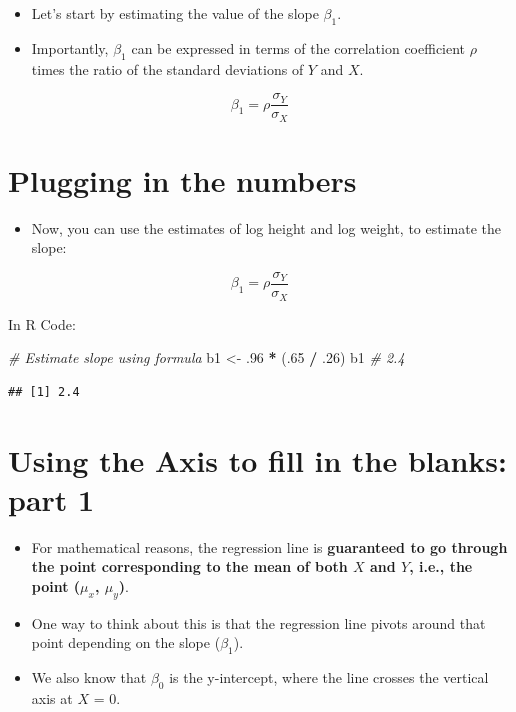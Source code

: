 \documentclass[
]{article}
\newenvironment{Shaded}{\begin{snugshade}}{\end{snugshade}}
\newcommand{\CommentTok}[1]{\textcolor[rgb]{0.56,0.35,0.01}{\textit{#1}}}
\newcommand{\DecValTok}[1]{\textcolor[rgb]{0.00,0.00,0.81}{#1}}
\newcommand{\NormalTok}[1]{#1}
\newcommand{\OtherTok}[1]{\textcolor[rgb]{0.56,0.35,0.01}{#1}}
\newcommand{\SpecialCharTok}[1]{\textcolor[rgb]{0.81,0.36,0.00}{\textbf{#1}}}
\providecommand{\tightlist}{%
  \setlength{\itemsep}{0pt}\setlength{\parskip}{0pt}}
\begin{document}
\begin{itemize}
\tightlist
\item
  Let's start by estimating the value of the slope \(\beta_1\).
\item
  Importantly, \(\beta_1\) can be expressed in terms of the correlation
  coefficient \(\rho\) times the ratio of the standard deviations of
  \(Y\) and \(X\).
\end{itemize}

\[\beta_1 = \rho\frac{ \sigma_Y}{\sigma_X}\]

\hypertarget{plugging-in-the-numbers}{%
\section{Plugging in the numbers}\label{plugging-in-the-numbers}}

\begin{itemize}
\tightlist
\item
  Now, you can use the estimates of log height and log weight, to
  estimate the slope:
\end{itemize}

\[\beta_1 = \rho\frac{ \sigma_Y}{\sigma_X}\]

In R Code:

\begin{Shaded}
\begin{Highlighting}[]
\CommentTok{\# Estimate slope using formula}
\NormalTok{b1 }\OtherTok{\textless{}{-}}\NormalTok{ .}\DecValTok{96} \SpecialCharTok{*}\NormalTok{ (.}\DecValTok{65} \SpecialCharTok{/}\NormalTok{ .}\DecValTok{26}\NormalTok{)}
\NormalTok{b1 }\CommentTok{\# 2.4}
\end{Highlighting}
\end{Shaded}

\begin{verbatim}
## [1] 2.4
\end{verbatim}

\hypertarget{using-the-axis-to-fill-in-the-blanks-part-1}{%
\section{Using the Axis to fill in the blanks: part
1}\label{using-the-axis-to-fill-in-the-blanks-part-1}}

\begin{itemize}
\item
  For mathematical reasons, the regression line is \textbf{guaranteed to
  go through the point corresponding to the mean of both \(X\) and
  \(Y\), i.e., the point (\(\mu_x\), \(\mu_y\))}.
\item
  One way to think about this is that the regression line pivots around
  that point depending on the slope (\(\beta_1\)).
\item
  We also know that \(\beta_0\) is the y-intercept, where the line
  crosses the vertical axis at \(X\) = 0.
\end{itemize}
\end{document}

